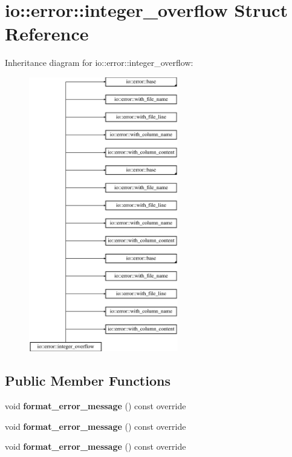 \hypertarget{structio_1_1error_1_1integer__overflow}{}\section{io\+:\+:error\+:\+:integer\+\_\+overflow Struct Reference}
\label{structio_1_1error_1_1integer__overflow}
Inheritance diagram for io\+:\+:error\+:\+:integer\+\_\+overflow\+:\begin{figure}[H]
\begin{center}
\leavevmode
\includegraphics[height=12.000000cm]{d4/dec/structio_1_1error_1_1integer__overflow}
\end{center}
\end{figure}
\subsection*{Public Member Functions}
\begin{DoxyCompactItemize}
\item 
\mbox{\label{structio_1_1error_1_1integer__overflow_a218d1e50166239ef963b7349a11c0221}} 
void {\bfseries format\+\_\+error\+\_\+message} () const override
\item 
\mbox{\label{structio_1_1error_1_1integer__overflow_a218d1e50166239ef963b7349a11c0221}} 
void {\bfseries format\+\_\+error\+\_\+message} () const override
\item 
\mbox{\label{structio_1_1error_1_1integer__overflow_a218d1e50166239ef963b7349a11c0221}} 
void {\bfseries format\+\_\+error\+\_\+message} () const override
\end{DoxyCompactItemize}
